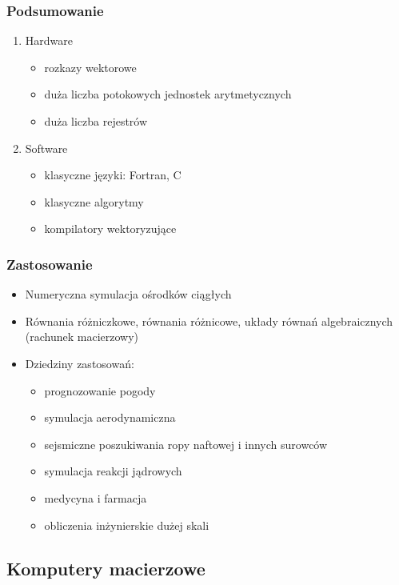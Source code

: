 \documentclass[a4paper,twoside]{article}
\begin{document}
			\subsubsection*{Podsumowanie}
				\begin{enumerate}
					\item Hardware
					\begin{itemize}
						\item rozkazy wektorowe
						\item duża liczba potokowych jednostek arytmetycznych
						\item duża liczba rejestrów
					\end{itemize}
					\item Software
					\begin{itemize}
						\item klasyczne języki: Fortran, C
						\item klasyczne algorytmy
						\item kompilatory wektoryzujące
					\end{itemize}
				\end{enumerate}
	
			\subsubsection*{Zastosowanie}
			\begin{itemize}
				\item Numeryczna symulacja ośrodków ciągłych
				\item Równania różniczkowe, równania różnicowe, układy równań algebraicznych (rachunek macierzowy)
				\item Dziedziny zastosowań:
				\begin{itemize}
					\item prognozowanie pogody
					\item symulacja aerodynamiczna
					\item sejsmiczne poszukiwania ropy naftowej i innych surowców
					\item symulacja reakcji jądrowych
					\item medycyna i farmacja
					\item obliczenia inżynierskie dużej skali
				\end{itemize}
			\end{itemize}
			
		\subsection*{Komputery macierzowe}
\end{document}
